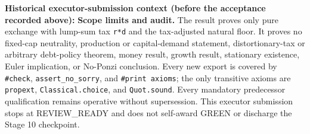 \documentclass[
  11pt,
]{article}
\let\LedgerOriginalTexttt\texttt
\renewcommand{\texttt}[1]{{\small\LedgerOriginalTexttt{#1}}}
\begin{document}
\textbf{Historical executor-submission context (before the acceptance
recorded above):} \textbf{Scope limits and audit.} The result proves
only pure exchange with lump-sum tax \texttt{r*d} and the tax-adjusted
natural floor. It proves no fixed-cap neutrality, production or
capital-demand statement, distortionary-tax or arbitrary debt-policy
theorem, money result, growth result, stationary existence, Euler
implication, or No-Ponzi conclusion. Every new export is covered by
\texttt{\#check}, \texttt{assert\_no\_sorry}, and
\texttt{\#print\ axioms}; the only transitive axioms are
\texttt{propext}, \texttt{Classical.choice}, and \texttt{Quot.sound}.
Every mandatory predecessor qualification remains operative without
supersession. This executor submission stops at REVIEW\_READY and does
not self-award GREEN or discharge the Stage 10 checkpoint.
\end{document}
